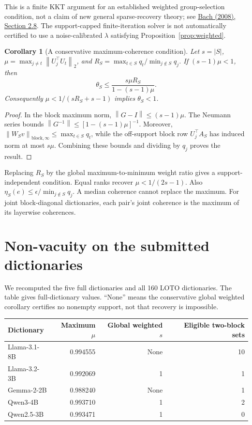 \documentclass[11pt]{article}
\newtheorem{corollary}{Corollary}
\newcommand{\norm}[1]{\left\lVert#1\right\rVert}
\begin{document}
This is a finite KKT argument for an established weighted group-selection
condition, not a claim of new general sparse-recovery theory; see
\href{https://www.jmlr.org/papers/v9/bach08b.html}{Bach (2008), Section 2.8}.
The support-capped finite-iteration solver is not automatically certified to use
a noise-calibrated $\lambda$ satisfying Proposition~\ref{prop:weighted}.

\begin{corollary}[A conservative maximum-coherence condition]
Let $s=|S|$, $\mu=\max_{j\ne t}\norm{U_j^\top U_t}_2$, and
$R_S=\max_{t\in S}q_t/\min_{j\notin S}q_j$. If $(s-1)\mu<1$, then
\[
 \theta_S\leq\frac{s\mu R_S}{1-(s-1)\mu}.
\]
Consequently $\mu<1/(sR_S+s-1)$ implies $\theta_S<1$.
\end{corollary}

\begin{proof}
In the block maximum norm, $\norm{G-I}\leq(s-1)\mu$. The Neumann series bounds
$\norm{G^{-1}}\leq[1-(s-1)\mu]^{-1}$. Moreover,
$\norm{W_Sv}_{\mathrm{block},\infty}\leq\max_{t\in S}q_t$, while the
off-support block row $U_j^\top A_S$ has induced norm at most $s\mu$.
Combining these bounds and dividing by $q_j$ proves the result.
\end{proof}

Replacing $R_S$ by the global maximum-to-minimum weight ratio gives a
support-independent condition. Equal ranks recover $\mu<1/(2s-1)$.
Also $\eta_S(e)\leq\epsilon/\min_{j\notin S}q_j$. A median coherence cannot
replace the maximum. For joint block-diagonal dictionaries, each pair's joint
coherence is the maximum of its layerwise coherences.

\section{Non-vacuity on the submitted dictionaries}

We recomputed the five full dictionaries and all 160 LOTO dictionaries.
The table gives full-dictionary values. ``None'' means the conservative global
weighted corollary certifies no nonempty support, not that recovery is impossible.
\begin{center}
\begin{tabular}{lrrr}
\toprule
Dictionary & Maximum $\mu$ & Global weighted $s$ & Eligible two-block sets\\
\midrule
Llama-3.1-8B &0.994555 &None &10\\
Llama-3.2-3B &0.992069 &1 &1\\
Gemma-2-2B &0.988240 &None &1\\
Qwen3-4B &0.993710 &1 &2\\
Qwen2.5-3B &0.993471 &1 &0\\
\bottomrule
\end{tabular}
\end{center}
\end{document}
